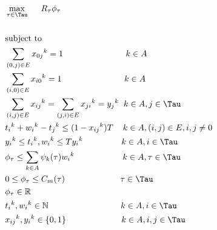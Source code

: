 \documentclass[conference]{IEEEtran}
\begin{document}
\begin{align}
&\displaystyle \max_{\tau \in \Tau}\hspace{0.5cm}R_\tau \phi_\tau \\ \notag\\
&\displaystyle \text{subject to} \notag \\
&\displaystyle \sum_{(0,j) \in E} {x_{0j}}^k  =  1\hspace{2.6cm}  {k \in A}\\ 
&\displaystyle \sum_{(i,0) \in E} {x_{i0}}^k  =  1 \hspace{2.6cm} {k \in A}\\ 
&\displaystyle \sum_{(i,j) \in E} {x_{ij}}^k  = \sum_{(j,i) \in E} {x_{ji}}^k = {y_j}^k \hspace{0.2cm} {k \in A,j \in \Tau}\\ 
&\displaystyle{{t_i}^k}+{{w_i}^k}-{{t_j}^k}\leq{(1-{{x_{ij}}^k})T} \hspace{0.4cm}{k \in A,(i,j) \in E,i,j \ne 0}\\
&{{y_i}^k} \leq {{t_i}^k},{{w_i}^k} \leq T{{y_i}^k}\hspace{1.6cm}  k \in A,i \in \Tau\\
&\phi_{\tau} \leq \sum_{k \in A} {\psi_k}(\tau){{w_i}^k} \hspace{2.0cm} k \in A,\tau \in \Tau\\
& 0 \leq \phi_{\tau} \leq C_{m}(\tau) \hspace{2.3cm} \tau \in \Tau \\
&\phi_{\tau} \in \mathbb{R} \\
&{{t_i}^k},{{w_i}^k} \in \mathbb{N}\hspace{3cm} k \in A,i \in \Tau\\
&{x_{ij}}^k,{y_i}^k \in \{0,1\} \hspace{2.3cm}k \in A,i,j \in \Tau
\end{align}
\end{document}
